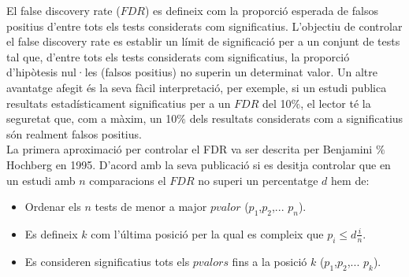 \documentclass[english]{article}
\begin{document}
El false discovery rate ($FDR$) es defineix com la proporció esperada de falsos positius d'entre tots els tests considerats com significatius. L'objectiu de controlar el false discovery rate es establir un límit de significació per a un conjunt de tests tal que, d'entre tots els tests considerats com significatius, la proporció d'hipòtesis nul·les (falsos positius) no superin un determinat valor.
Un altre avantatge afegit és la seva fàcil interpretació, per exemple, si un estudi publica resultats estadísticament significatius per a un $FDR$ del 10$\%$, el lector té la seguretat que, com a màxim, un 10$\%$ dels resultats considerats com a significatius són realment falsos positius.
\\
La primera aproximació per controlar el FDR va ser descrita per Benjamini $\%$ Hochberg en 1995. D'acord amb la seva publicació si es desitja controlar que en un estudi amb $n$ comparacions el $FDR$ no superi un percentatge $d$ hem de:

\begin{itemize}
\item Ordenar els $n$ tests de menor a major $pvalor$ ($p_{1}$,$p_{2}$,... $p_n$).
\item Es defineix $k$ com l'última posició per la qual es compleix que $p_i \leq d\frac{i}{n}$.
\item Es consideren significatius tots els $pvalors$ fins a la posició $k$ ($p_{1}$,$p_{2}$,... $p_k$).

\end{itemize}
\end{document}
